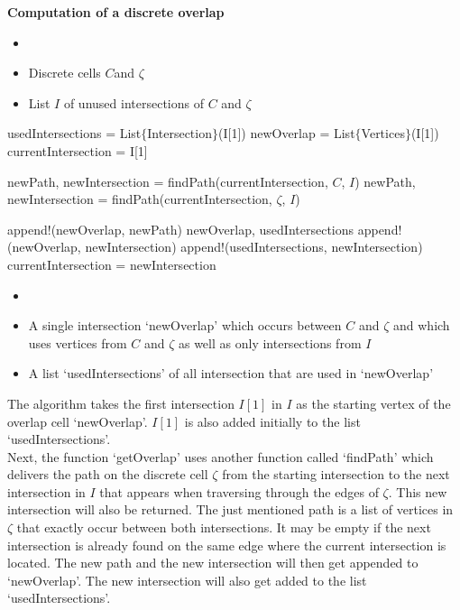 \begin{algorithm} \textbf{Computation of a discrete overlap} \label{alge:discreteOverlap}
	\begin{itemize} 
		\itemsep0em 
		\item[] 
		\item Discrete cells  $C$and $\zeta$
		\item List $I$ of unused intersections of $C$ and $\zeta$ 
	\end{itemize}
	\begin{algorithmic}
			\State usedIntersections = List$\{$Intersection$\}$(I[1]) 
			\State newOverlap = List$\{$Vertices$\}$(I[1]) 
			\State currentIntersection = I[1]
			
			
					\State newPath, newIntersection = findPath(currentIntersection, $C$, $I$) 
				\Else 
					\State newPath, newIntersection = findPath(currentIntersection, $\zeta$, $I$) 
				\EndIf
				
				\State append!(newOverlap, newPath)
					\State \Return newOverlap, usedIntersections
				\Else 
					\State append!(newOverlap, newIntersection)
					\State append!(usedIntersections, newIntersection) 
					\State currentIntersection = newIntersection
				\EndIf
			\EndFor
		\EndFunction
	\end{algorithmic}
	\begin{itemize} 
		\itemsep0em 
		\item[] 
		\item A single intersection `newOverlap' which occurs between $C$ and $\zeta$ and which uses vertices from  $C$ and $\zeta$ as well as only intersections from $I$
		\item A list `usedIntersections' of all intersection that are used in `newOverlap'
	\end{itemize}	
\end{algorithm}
The algorithm takes the first intersection $I[1]$ in $I$ as the starting vertex of the overlap cell `newOverlap'. 
$I[1]$ is also added initially to the list `usedIntersections'. \\
Next, the function `getOverlap' uses another function called `findPath' which delivers the path on the discrete cell $\zeta$ from the starting intersection to the next intersection in $I$ that appears when traversing through the edges of $\zeta$. This new intersection will also be returned. The just mentioned path is a list of vertices in $\zeta$ that exactly occur between both intersections. It may be empty if the next intersection is already found on the same edge where the current intersection is located. The new path and the new intersection will then get appended to `newOverlap'. The new intersection will also get added to the list `usedIntersections'. \\
